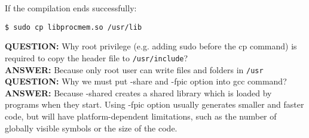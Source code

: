 \documentclass[12pt]{article}
\begin{document}
        If the compilation ends successfully:
        \begin{lstlisting}
$ sudo cp libprocmem.so /usr/lib\end{lstlisting}
        \textbf{QUESTION:} Why root privilege (e.g. adding sudo before the cp command) is 
        required to copy the header file to \texttt{/usr/include}?\\
        \textbf{ANSWER:} Because only root user can write files and folders in \texttt{/usr}\\
        \textbf{QUESTION:} Why we must put -share and -fpic option into gcc command?\\
        \textbf{ANSWER:} Because -shared creates a shared library which is loaded by programs when 
        they start. Using -fpic option usually generates smaller and faster code, but will have 
        platform-dependent limitations, such as the number of globally visible symbols or the 
        size of the code.\\
\end{document}
